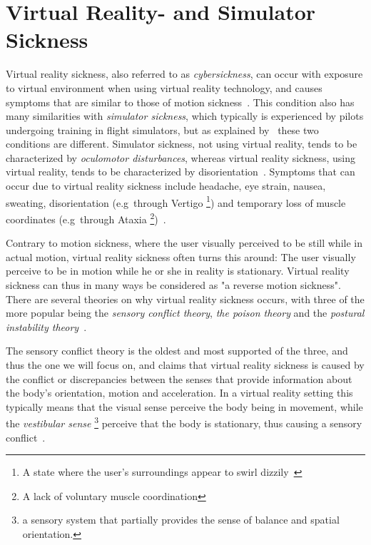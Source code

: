 \section{Virtual Reality- and Simulator Sickness}
\label{sec:vr_sickness}

Virtual reality sickness, also referred to as \textit{cybersickness}, can occur with exposure to virtual environment when using virtual reality technology, 
and causes symptoms that are similar to those of motion sickness~\citep{Jr2000}. This condition also has many similarities with \textit{simulator sickness}, which
typically is experienced by pilots undergoing training in flight simulators, but as explained by~\citet{Stanney1997} these two conditions are different.
Simulator sickness, not using virtual reality, tends to be characterized by \textit{oculomotor disturbances}, whereas virtual reality sickness, using virtual reality,
tends to be characterized by disorientation~\citep{Stanney1997}. 
Symptoms that can occur due to virtual reality sickness include headache, eye strain, nausea, sweating, disorientation (e.g~through Vertigo
\footnote{A state where the user's surroundings appear to swirl dizzily~\citep{Jr2000}}) and temporary loss of muscle coordinates (e.g~through Ataxia
\footnote{A lack of voluntary muscle coordination})~\citep{Jr2000}.

Contrary to motion sickness, where the user visually perceived to be still while in actual motion, 
virtual reality sickness often turns this around: The user visually perceive to be in motion while he or she in reality is stationary. 
Virtual reality sickness can thus in many ways be considered as "a reverse motion sickness". There are several theories on why virtual reality sickness 
occurs, with three of the more popular being the \textit{sensory conflict theory}, \textit{the poison theory} and the \textit{postural instability theory}~\citep{Jr2000}.

The sensory conflict theory is the oldest and most supported of the three, and thus the one we will focus on, 
and claims that virtual reality sickness is caused by the conflict or discrepancies between the senses that provide information about the body's orientation, motion and acceleration. 
In a virtual reality setting this typically means that the visual sense perceive the body being in movement, while the \textit{vestibular sense}
\footnote{a sensory system that partially provides the sense of balance and spatial orientation.} perceive that the body is stationary, thus causing a sensory conflict~\citep{Jr2000}.

